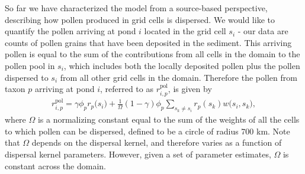 \documentclass[12pt]{article}
\begin{document}



So far we have characterized the model from a source-based
perspective, describing how pollen produced in grid cells is
dispersed. We would like to quantify the pollen arriving at pond $i$
located in the grid cell $s_i$ - our data are counts of pollen grains
that have been deposited in the sediment. This arriving pollen is
equal to the sum of the contributions from all cells in the domain to
the pollen pool in $s_i$, which includes both the locally deposited
pollen plus the pollen dispersed to $s_i$ from all other grid cells
in the domain. Therefore the pollen from taxon $p$ arriving at pond
$i$, referred to as $r_{i,p}^{\text{pol}}$, is given by
\begin{align}
r_{i,p}^{\text{pol}} = \gamma \phi_p r_p\bigl(s_i\bigr) + \frac{1}{\Omega} (1-\gamma) \phi_p \sum_{s_k \neq s_i } r_p(s_k) w\bigl(s_i, s_k\bigr),
\label{eq:arriving}
\end{align}
where $\Omega$ is a normalizing constant equal to the sum of the
weights of all the cells to which pollen can be dispersed, defined to
be a circle of radius 700 km. Note that $\Omega$ depends on the
dispersal kernel, and therefore varies as a function of dispersal
kernel parameters. However, given a set of parameter estimates,
$\Omega$ is constant across the domain.
\end{document}
